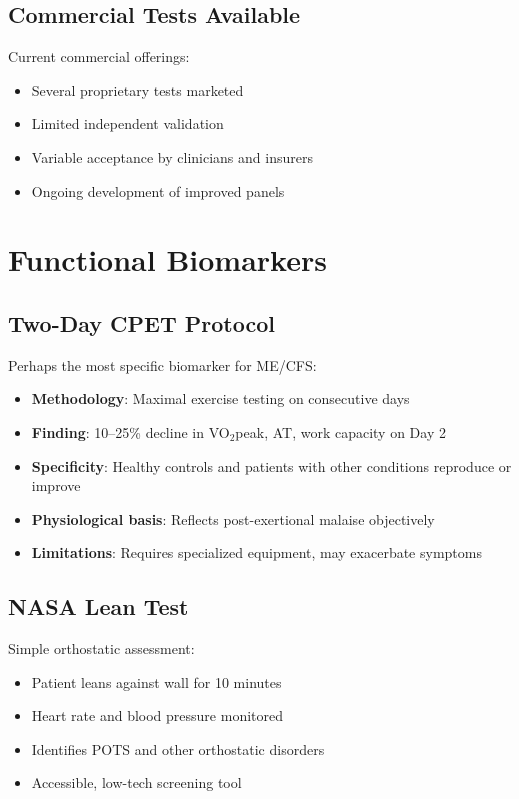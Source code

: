 \subsection{Commercial Tests Available}

Current commercial offerings:
\begin{itemize}
    \item Several proprietary tests marketed
    \item Limited independent validation
    \item Variable acceptance by clinicians and insurers
    \item Ongoing development of improved panels
\end{itemize}

\section{Functional Biomarkers}
\label{sec:functional-biomarkers}

\subsection{Two-Day CPET Protocol}

Perhaps the most specific biomarker for ME/CFS:
\begin{itemize}
    \item \textbf{Methodology}: Maximal exercise testing on consecutive days
    \item \textbf{Finding}: 10--25\% decline in VO$_2$peak, AT, work capacity on Day 2
    \item \textbf{Specificity}: Healthy controls and patients with other conditions reproduce or improve
    \item \textbf{Physiological basis}: Reflects post-exertional malaise objectively
    \item \textbf{Limitations}: Requires specialized equipment, may exacerbate symptoms
\end{itemize}

\subsection{NASA Lean Test}

Simple orthostatic assessment:
\begin{itemize}
    \item Patient leans against wall for 10 minutes
    \item Heart rate and blood pressure monitored
    \item Identifies POTS and other orthostatic disorders
    \item Accessible, low-tech screening tool
\end{itemize}

